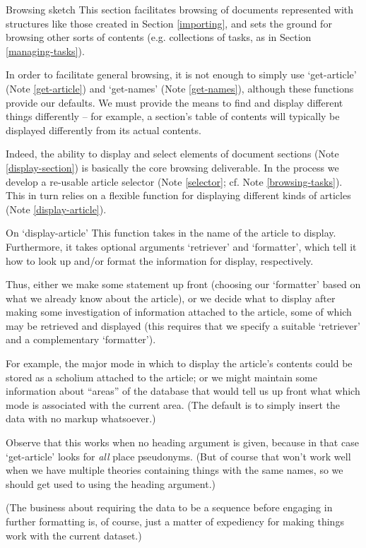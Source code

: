 \begin{notate}{Browsing sketch} \label{browsing-sketch}
This section facilitates browsing of documents represented
with structures like those created in Section
\ref{importing}, and sets the ground for browsing other
sorts of contents (e.g. collections of tasks, as in
Section \ref{managing-tasks}).

In order to facilitate general browsing, it is not enough
to simply use `get-article' (Note \ref{get-article}) and
`get-names' (Note \ref{get-names}), although these
functions provide our defaults.  We must provide the means
to find and display different things differently -- for
example, a section's  table of contents will typically
be displayed differently from its actual contents.

Indeed, the ability to display and select elements of
document sections (Note \ref{display-section}) is
basically the core browsing deliverable.  In the process
we develop a re-usable article selector (Note
\ref{selector}; cf. Note \ref{browsing-tasks}).  This in
turn relies on a flexible function for displaying
different kinds of articles (Note \ref{display-article}).
\end{notate}

\begin{notate}{On `display-article'} \label{display-article}
This function takes in the name of the article to display.
Furthermore, it takes optional arguments `retriever' and
`formatter', which tell it how to look up and/or format
the information for display, respectively.

Thus, either we make some statement up front (choosing our
`formatter' based on what we already know about the
article), or we decide what to display after making some
investigation of information attached to the article, some
of which may be retrieved and displayed (this requires
that we specify a suitable `retriever' and a complementary
`formatter').

For example, the major mode in which to display the
article's contents could be stored as a scholium attached
to the article; or we might maintain some information
about ``areas'' of the database that would tell us up
front what which mode is associated with the current area.
(The default is to simply insert the data with no markup
whatsoever.)

Observe that this works when no heading argument is given,
because in that case `get-article' looks for \emph{all}
place pseudonyms.  (But of course that won't work well
when we have multiple theories containing things with the
same names, so we should get used to using the heading
argument.)

(The business about requiring the data to be a sequence
before engaging in further formatting is, of course, just
a matter of expediency for making things work with the
current dataset.)
\end{notate}

